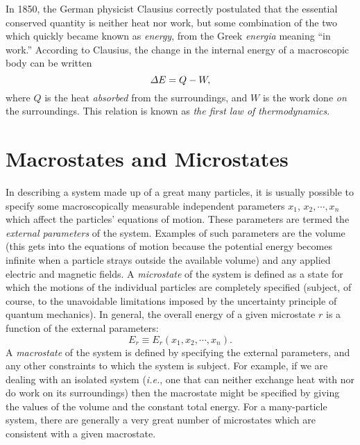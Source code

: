 In 1850, the German physicist Clausius correctly
postulated that the essential conserved quantity
is neither heat nor work, but some combination of the two which quickly became
known as {\em energy}, from the Greek {\em energia}\/ meaning ``in work.''\@
According to Clausius, the change in the internal energy of a macroscopic body
can be written
\begin{equation}
{\mit\Delta} E = Q - W,
\end{equation}
where $Q$ is the heat {\em absorbed}\/ from the surroundings, and $W$ is the work done 
 {\em on}\/ the surroundings. This relation is known as {\em the first law of 
thermodynamics}. 

\section{Macrostates and Microstates}
In describing a system made up of a great many particles,
it is usually  possible to specify
some macroscopically measurable independent parameters $x_1$, $x_2, \cdots, x_n$
which affect the  particles' equations of motion. 
These parameters are termed the {\em external parameters}\/ of the system.
Examples of such parameters are the volume (this gets into the equations
of motion because the potential energy  becomes infinite when a particle
strays outside the available volume) and any applied electric and magnetic fields.
A {\em microstate}\/ of the system is defined as a state for
which the motions of the individual
particles are completely specified (subject, of course, 
 to the unavoidable limitations imposed
by the uncertainty principle of quantum mechanics).
In general, the overall energy of a given microstate $r$  is a function
of the external parameters:
\begin{equation}
E_r \equiv E_r(x_1, x_2, \cdots, x_n).\label{e4.6}
\end{equation}
A {\em macrostate}\/ of the system is defined by specifying the external parameters,
and any other constraints to which the system is subject. For example, if we
are dealing with an isolated system ({\em i.e.}, one that can neither exchange heat with nor
do work on its surroundings) then the macrostate might be specified by giving the
values of the volume and the constant total energy. 
For a many-particle system, there are generally a very great
number of microstates which are consistent with a given macrostate.

